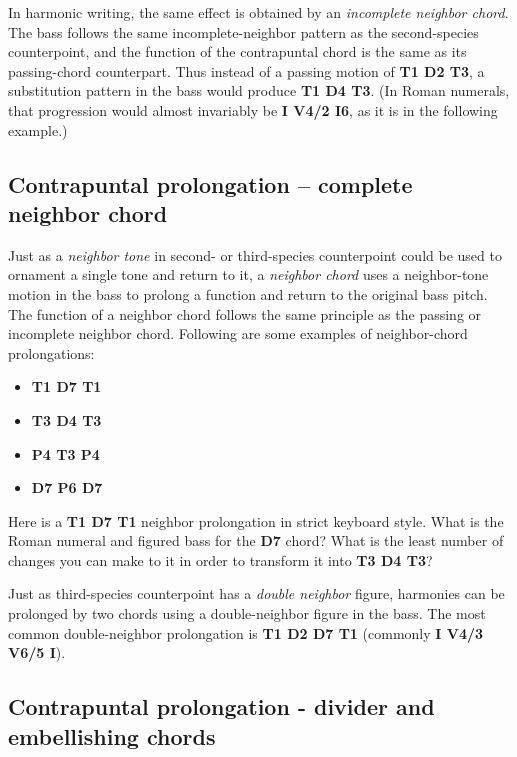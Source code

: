 \documentclass{book}
\providecommand{\tightlist}{%
  \setlength{\itemsep}{0pt}\setlength{\parskip}{0pt}}
\begin{document}
In harmonic writing, the same effect is obtained by an \emph{incomplete
neighbor chord}. The bass follows the same incomplete-neighbor pattern as the
second-species counterpoint, and the function of the contrapuntal chord is the
same as its passing-chord counterpart. Thus instead of a passing motion of
\textbf{T1 D2 T3}, a substitution pattern in the bass would produce \textbf{T1
D4 T3}. (In Roman numerals, that progression would almost invariably be
\textbf{I V4/2 I6}, as it is in the following example.)

\hypertarget{contrapuntal-prolongation-complete-neighbor-chord}{%
\subsection{Contrapuntal prolongation -- complete neighbor
chord}\label{contrapuntal-prolongation-complete-neighbor-chord}}

Just as a \emph{neighbor tone} in second- or third-species counterpoint could
be used to ornament a single tone and return to it, a \emph{neighbor chord}
uses a neighbor-tone motion in the bass to prolong a function and return to
the original bass pitch. The function of a neighbor chord follows the same
principle as the passing or incomplete neighbor chord. Following are some
examples of neighbor-chord prolongations:

\begin{itemize}
\tightlist
\item
  \textbf{T1 D7 T1}\\
\item
  \textbf{T3 D4 T3}\\
\item
  \textbf{P4 T3 P4}\\
\item
  \textbf{D7 P6 D7}
\end{itemize}

Here is a \textbf{T1 D7 T1} neighbor prolongation in strict keyboard style.
What is the Roman numeral and figured bass for the \textbf{D7} chord? What is
the least number of changes you can make to it in order to transform it into
\textbf{T3 D4 T3}?

Just as third-species counterpoint has a \emph{double neighbor} figure,
harmonies can be prolonged by two chords using a double-neighbor figure in the
bass. The most common double-neighbor prolongation is \textbf{T1 D2 D7 T1}
(commonly \textbf{I V4/3 V6/5 I}).

\hypertarget{contrapuntal-prolongation---divider-and-embellishing-chords}{%
\subsection{Contrapuntal prolongation - divider and embellishing
chords}\label{contrapuntal-prolongation---divider-and-embellishing-chords}}
\end{document}
